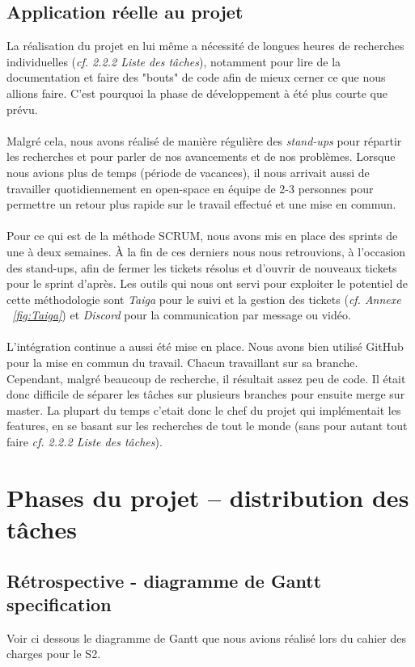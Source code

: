 \documentclass[french]{report}
\begin{document}
\subsection{Application réelle au projet}
La réalisation du projet en lui même a nécessité de longues heures de recherches
individuelles (\emph{cf. 2.2.2 Liste des tâches}), notamment pour lire de la documentation et faire des "bouts" de
code afin de mieux cerner ce que nous allions faire. C'est pourquoi la phase de développement à
été plus courte que prévu.
\\
\\
Malgré cela, nous avons réalisé de manière régulière des \emph{stand-ups} pour
répartir les recherches et pour parler de nos avancements et de nos problèmes.
Lorsque nous avions
plus de temps (période de vacances), il nous arrivait aussi de travailler
quotidiennement en open-space en équipe de 2-3 personnes pour permettre un
retour plus rapide sur le travail effectué et une mise en commun.
\\
\\
Pour ce qui est de la méthode SCRUM, nous avons mis en place des sprints de une
à deux semaines. À la fin de ces derniers nous nous retrouvions, à
l'occasion des stand-ups, afin de fermer les tickets résolus et d’ouvrir de
nouveaux tickets pour le sprint d’après. Les outils qui nous ont servi
pour exploiter le potentiel de cette méthodologie
sont \emph{Taiga} pour le suivi et la gestion des tickets (\emph{cf. Annexe ~\ref{fig:Taiga}})
et \emph{Discord} pour la communication par message ou vidéo.
\\
\\
L'intégration continue a aussi été mise en place. Nous avons bien
utilisé GitHub pour la mise en commun du travail. Chacun travaillant sur sa
branche. Cependant, malgré beaucoup de recherche, il résultait assez peu de code. Il
était donc difficile de séparer les tâches sur plusieurs branches pour ensuite
merge sur master. La plupart du temps c'etait donc le chef du projet qui
implémentait les features, en se basant sur les recherches de tout le monde (sans
pour autant tout faire \emph{cf. 2.2.2 Liste des tâches}).

\section{Phases du projet – distribution des tâches}

\subsection{Rétrospective - diagramme de Gantt specification}
Voir ci dessous le diagramme de Gantt que nous avions réalisé lors du cahier
des charges pour le S2.
\end{document}

